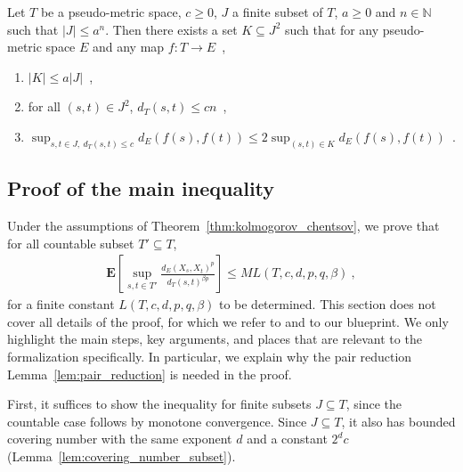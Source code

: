 \documentclass[lean]{Draft}
\makeatletter
\newcommand\leanlink{\begingroup\catcode`\#=12\relax\@leanlink}
\newcommand\@leanlink[2]{\endgroup
\href{#1}
{\texttt{\detokenize{#2}}}}
\newcommand{\docs}[1]{%
\leanlink{https://remydegenne.github.io/brownian-motion/docs/find/?pattern=#1\#doc}
{#1}}
\makeatother
\begin{document}
\begin{lemma}[\cite{kratschmer2023kolmogorov} Lemma 6.1, extension of \cite{talagrand2014}, B.2.7, \docs{EMetric.pair_reduction}]\label{lem:pair_reduction}
Let $T$ be a pseudo-metric space, $c \ge 0$, $J$ a finite subset of $T$, $a \ge 0$ and $n \in \mathbb{N}$ such that $\lvert J \rvert \le a^n$.
Then there exists a set $K \subseteq J^2$ such that for any pseudo-metric space $E$ and any map $f: T \to E$~,
\begin{enumerate}
  \item $\lvert K \rvert \le a \lvert J \rvert$~,
  \item for all $(s, t) \in J^2$, $d_T(s, t) \le cn$~,
  \item $\sup_{s, t \in J, \: d_T(s, t) \le c} d_E(f(s), f(t)) \le 2 \sup_{(s, t) \in K} d_E(f(s), f(t))$~.
\end{enumerate}
\end{lemma}


\subsection{Proof of the main inequality}

Under the assumptions of Theorem~\ref{thm:kolmogorov_chentsov}, we prove that for all countable subset $T' \subseteq T$,
\begin{align*}
  \mathbf{E}\left[ \sup_{s, t \in T'} \frac{d_E(X_s, X_t)^p}{d_T(s, t)^{\beta p}} \right]
  \le M L(T, c, d, p, q, \beta)
  \: ,
\end{align*}
for a finite constant $L(T, c, d, p, q, \beta)$ to be determined.
This section does not cover all details of the proof, for which we refer to \cite{kratschmer2023kolmogorov} and to our blueprint. We only highlight the main steps, key arguments, and places that are relevant to the formalization specifically.
In particular, we explain why the pair reduction Lemma~\ref{lem:pair_reduction} is needed in the proof.

First, it suffices to show the inequality for finite subsets $J \subseteq T$, since the countable case follows by monotone convergence.
Since $J \subseteq T$, it also has bounded covering number with the same exponent $d$ and a constant $2^d c$ (Lemma~\ref{lem:covering_number_subset}).
\end{document}
